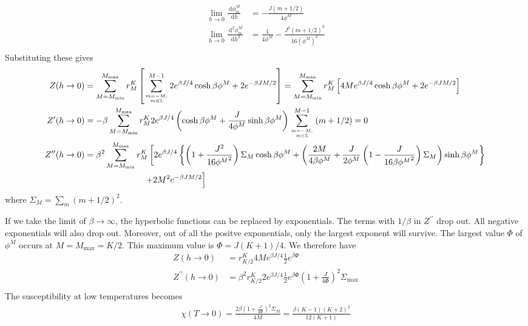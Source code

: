 \documentclass{revtex4-2}
\numberwithin{equation}{section}
\begin{document}
\begin{equation}\begin{aligned}
	\lim_{h \to 0}\frac{\:\mathrm{d}\phi_m^M}{\:\mathrm{d}h} &= -\frac{J(m+1/2)}{4\phi^M}\\
	\lim_{h \to 0}\frac{\:\mathrm{d}^2\phi_m^M}{\:\mathrm{d}h^2} &= \frac{1}{4\phi^M} - \frac{J^2(m + 1/2)^2}{16\left(\phi^M\right)^3}\\
\end{aligned}\end{equation}
Substituting these gives
\begin{equation}\begin{aligned}
	     Z(h \to 0) &=\sum_{M=M_\text{min}}^{M_\text{max}}r^K_M\left[\sum_{m=-M, \atop{m\in \mathbb{Z}}}^{M-1}2e^{\beta J/4}\cosh \beta\phi^M + 2e^{-\beta JM/2}\right] = \sum_{M=M_\text{min}}^{M_\text{max}}r^K_M\left[4Me^{\beta J/4}\cosh \beta\phi^M + 2e^{-\beta JM/2}\right]\\
	Z^\prime(h \to 0) &=-\beta\sum_{M=M_\text{min}}^{M_\text{max}}r^K_M2e^{\beta J/4} \left(\cosh \beta\phi^M + \frac{J}{4\phi^M}\sinh \beta\phi^M\right)\sum_{m=-M, \atop{m\in \mathbb{Z}}}^{M-1}\left( m + 1/2 \right) = 0\\
Z^{\prime\prime}(h \to 0) &=\beta^2\sum_{M=M_\text{min}}^{M_\text{max}}r^K_M\left[2 e^{\beta J/4}\left\{\left(1 + \frac{J^2}{16{\phi^M}^2}\right) \Sigma_M \cosh \beta\phi^M + \left(\frac{2M}{4\beta\phi^M} + \frac{J}{2\phi^M}\left(1 - \frac{J}{16\beta{\phi^M}^2}\right)\Sigma_M \right) \sinh \beta\phi^M\right\} \right.\\
			  &\quad\quad\quad\quad\quad\quad\quad\left.+ 2 M^2 e^{-\beta JM/2}\right]\\
\end{aligned}\end{equation}
where \(\Sigma_M = \sum_m (m+1/2)^2\).

If we take the limit of \(\beta \to \infty\), the hyperbolic functions can be replaced by exponentials. The terms with \(1/\beta\) in \(Z^{\prime\prime}\) drop out. All negative exponentials will also drop out. Moreover, out of all the positve exponentials, only the largest exponent will survive. The largest value \(\Phi\) of \(\phi^M\) occurs at \(M = M_\text{max} = K/2\). This maximum value is \(\Phi = J(K+1)/4\). We therefore have
\begin{equation}\begin{aligned}
	     Z(h \to 0) &= r^K_{K/2} 4Me^{\beta J/4}\frac{1}{2}e^{\beta\Phi}\\
	     Z^{\prime\prime}(h \to 0) &=\beta^2 r^K_{K/2}2 e^{\beta J/4}\frac{1}{2}e^{\beta \Phi}\left(1 + \frac{J}{4\Phi}\right)^2\Sigma_\text{max}\\
\end{aligned}\end{equation}
The susceptibility at low temperatures becomes
\begin{equation}\begin{aligned}
	\chi(T \to 0) = \frac{2\beta\left(1 + \frac{J}{4\Phi}\right)^2\Sigma_M}{4M} = \frac{\beta (K-1)(K+2)^2}{12(K+1)}
\end{aligned}\end{equation}
\end{document}

